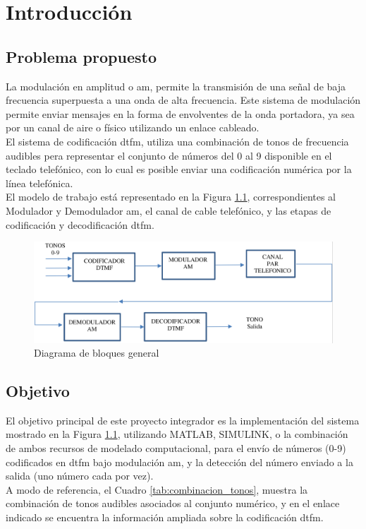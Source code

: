 \chapter{Introducción}
\section{Problema propuesto}
La modulación en amplitud o \gls{am}, permite la transmisión de una señal de baja frecuencia superpuesta a una onda de alta frecuencia. Este sistema de modulación permite enviar mensajes en la forma de envolventes de la onda portadora, ya sea por un canal de aire o físico utilizando un enlace cableado.\\
El sistema de codificación \gls{dtfm}, utiliza una combinación de tonos de frecuencia audibles pera representar el conjunto de números del 0 al 9 disponible en el teclado telefónico, con lo cual es posible enviar una codificación numérica por la línea telefónica.\\
El modelo de trabajo está representado en la Figura \ref{fig:intro_diagrama_bloques}, correspondientes al Modulador y Demodulador \gls{am}, el canal de cable telefónico, y las etapas de codificación y decodificación \gls{dtfm}.

\begin{figure}[ht]
  \centering
  \includegraphics[width=\linewidth]{images/intro_diagrama_general.png}
  \caption{Diagrama de bloques general}
  \label{fig:intro_diagrama_bloques}
\end{figure}

\section{Objetivo}
El objetivo principal de este proyecto integrador es la implementación del sistema mostrado en la Figura \ref{fig:intro_diagrama_bloques}, utilizando MATLAB, SIMULINK, o la combinación de ambos recursos de modelado computacional, para el envío de números (0-9) codificados en \gls{dtfm} bajo modulación \gls{am}, y la detección del número enviado a la salida (uno número cada por vez).\\
A modo de referencia, el Cuadro \ref{tab:combinacion_tonos}, muestra la combinación de tonos audibles asociados al conjunto numérico, y en el enlace indicado se encuentra la información ampliada sobre la codificación \gls{dtfm}.

